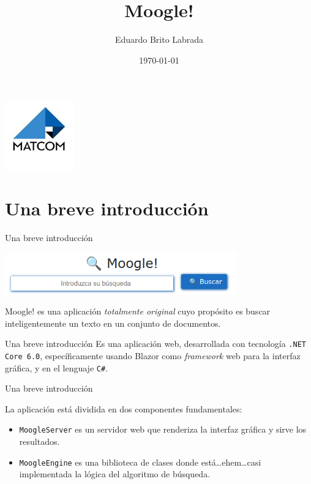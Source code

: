 \documentclass{beamer}
\title[Moogle!]{\LARGE Moogle!}
\author{Eduardo Brito Labrada}
\institute[Universidad de La Habana]
{
  Facultad de Matem\'atica y Computaci\'on
}
\date{\today}
\begin{document}
\begin{frame}
\begin{center}
  \includegraphics[height=3cm]{images/matcom.jpg}  
\end{center}
\maketitle
\end{frame}

\section{Una breve introducci\'on}

\begin{frame}{Una breve introducci\'on}
  \begin{center}
    \includegraphics[width=10cm]{images/moogle.png}
  \end{center}

  Moogle! es una aplicación {\em totalmente original} cuyo propósito es buscar
  inteligentemente un texto en un conjunto de documentos.
\end{frame}

\begin{frame}{Una breve introducci\'on}
  Es una aplicación web, desarrollada con tecnología {\tt .NET Core 6.0}, específicamente
  usando Blazor como {\it framework} web para la interfaz gráfica, y en el
  lenguaje {\tt C\#}. \\
\end{frame}

\begin{frame}{Una breve introducci\'on}

  La aplicación está dividida en dos componentes fundamentales:

  \begin{itemize}[<+->]
    \item {\tt MoogleServer} es un servidor web que renderiza la interfaz gráfica y sirve los resultados.
    \item {\tt MoogleEngine} es una biblioteca de clases donde está\dots ehem\dots casi implementada la lógica del algoritmo de búsqueda.
  \end{itemize}
\end{frame}
\end{document}
